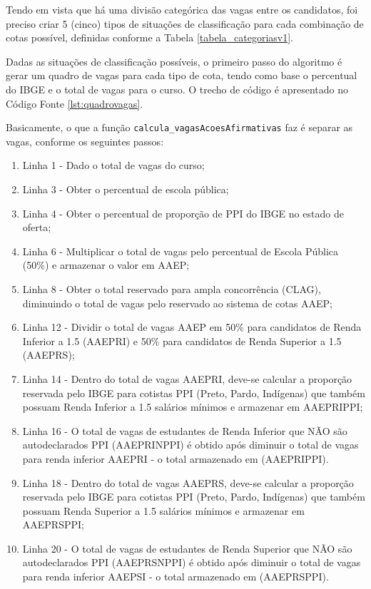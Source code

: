 Tendo em vista que há uma divisão categórica das vagas entre os candidatos, foi preciso criar 5 (cinco) tipos de situações de classificação para cada combinação de cotas possível, definidas conforme a Tabela \ref{tabela_categoriasv1}.



\newpage
Dadas as situações de classificação possíveis, o primeiro passo do algoritmo é gerar um quadro de vagas para cada tipo de cota, tendo como base o percentual do \gls{IBGE} e o total de vagas para o curso. O trecho de código é apresentado no Código Fonte \ref{lst:quadrovagas}.




Basicamente, o que a função \texttt{calcula\_vagasAcoesAfirmativas} faz é separar as vagas, conforme os seguintes passos:

\begin{enumerate}
    \item Linha 1 - Dado o total de vagas do curso;
    \item Linha 3 - Obter o percentual de escola pública;
    \item Linha 4 - Obter o percentual de proporção de PPI do IBGE no estado de oferta;
    \item Linha 6 - Multiplicar o total de vagas pelo percentual de Escola Pública (50\%) e armazenar o valor em AAEP;
    \item Linha 8 - Obter o total reservado para ampla concorrência (CLAG), diminuindo o total de vagas pelo reservado ao sistema de cotas AAEP;
    \item Linha 12 - Dividir o total de vagas AAEP em 50\% para candidatos de Renda Inferior a 1.5 (AAEPRI) e 50\% para candidatos de Renda Superior a 1.5 (AAEPRS);
    \item Linha 14 - Dentro do total de vagas AAEPRI, deve-se calcular a proporção reservada pelo IBGE para cotistas PPI (Preto, Pardo, Indígenas) que também possuam Renda Inferior a 1.5 salários mínimos e armazenar em AAEPRIPPI;
    \item Linha 16 - O total de vagas de estudantes de Renda Inferior que NÃO são autodeclarados PPI (AAEPRINPPI) é obtido após diminuir o total de vagas para renda inferior AAEPRI - o total armazenado em (AAEPRIPPI).
    \item Linha 18 - Dentro do total de vagas AAEPRS, deve-se calcular a proporção reservada pelo IBGE para cotistas PPI (Preto, Pardo, Indígenas) que também possuam Renda Superior a 1.5 salários mínimos e armazenar em AAEPRSPPI;
    \item Linha 20 - O total de vagas de estudantes de Renda Superior que NÃO são autodeclarados PPI (AAEPRSNPPI) é obtido após diminuir o total de vagas para renda inferior AAEPSI - o total armazenado em (AAEPRSPPI).
\end{enumerate}{}

